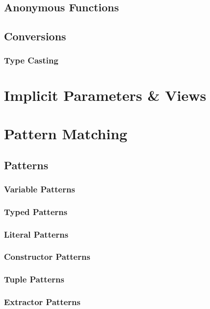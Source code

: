 \section{Anonymous Functions}

\section{Conversions}

\subsection{Type Casting}

\chapter{Implicit Parameters \& Views}

\chapter{Pattern Matching}

\section{Patterns}

\subsection{Variable Patterns}

\subsection{Typed Patterns}

\subsection{Literal Patterns}

\subsection{Constructor Patterns}

\subsection{Tuple Patterns}

\subsection{Extractor Patterns}

